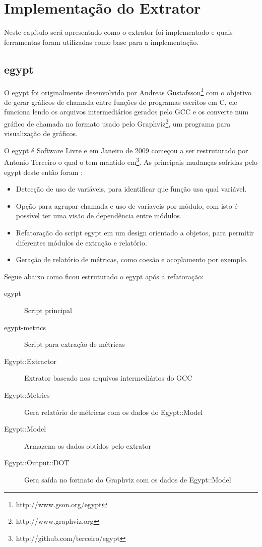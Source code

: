 \chapter{Implementação do Extrator} \label{ch:implementacao}

Neste capítulo será apresentado como o extrator foi implementado e quais
ferramentas foram utilizadas como base para a implementação.

\section{egypt} \label{sec:egypt}

O egypt foi originalmente desenvolvido por Andreas
Gustafsson\footnote{http://www.gson.org/egypt} com o objetivo de gerar gráficos
de chamada entre funções de programas escritos em C, ele funciona lendo os
arquivos intermediários gerados pelo GCC e os
converte num gráfico de chamada no formato usado pelo
Graphviz\footnote{http://www.graphviz.org}, um programa para visualização de
gráficos.

O egypt é Software Livre e em Janeiro de 2009 começou a ser restruturado por
Antonio Terceiro o qual o tem mantido
em\footnote{http://github.com/terceiro/egypt}. As principais mudanças sofridas
pelo egypt deste então foram \cite{structuralComplexityEvolution}:

\begin{itemize}
\item Detecção de uso de variáveis, para identificar que função usa qual
variável.
\item Opção para agrupar chamada e uso de variaveis por módulo, com isto é
possível ter uma visão de dependência entre módulos.
\item Refatoração do script egypt em um design orientado a objetos, para
permitir diferentes módulos de extração e relatório.
\item Geração de relatório de métricas, como coesão e acoplamento por exemplo.
\end{itemize}

Segue abaixo como ficou estruturado o egypt após a refatoração:

\begin{description}
\item[egypt] Script principal
\item[egypt-metrics] Script para extração de métricas
\item[Egypt::Extractor] Extrator baseado nos arquivos intermediários do GCC
\item[Egypt::Metrics] Gera relatório de métricas com os dados do Egypt::Model
\item[Egypt::Model] Armazena os dados obtidos pelo extrator
\item[Egypt::Output::DOT] Gera saída no formato do Graphviz com os dados de Egypt::Model
\end{description}

